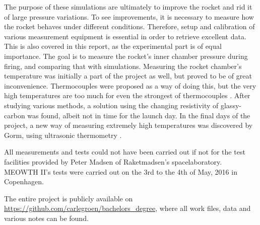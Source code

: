 The purpose of these simulations are ultimately to improve the rocket and rid it of large pressure variations. To see improvements, it is necessary to measure how the rocket behaves under different conditions. Therefore, setup and calibration of various measurement equipment is essential in order to retrieve excellent data. This is also covered in this report, as the experimental part is of equal importance. The goal is to measure the rocket's inner chamber pressure during firing, and comparing that with simulations. Measuring the rocket chamber's temperature was initially a part of the project as well, but proved to be of great inconvenience. Thermocouples were proposed as a way of doing this, but the very high temperatures are too much for even the strongest of thermocouples \cite{thermocoup}. After studying various methods, a solution using the changing resistivity of glassy-carbon was found, albeit not in time for the launch day. In the final days of the project, a new way of measuring extremely high temperatures was discovered by Gorm, using ultrasonic thermometry \cite{ultrasonic}.
 

All measurements and tests could not have been carried out if not for the test facilities provided by Peter Madsen of Raketmadsen's spacelaboratory. MEOWTH II's tests were carried out on the 3rd to the 4th of May, 2016 in Copenhagen.

The entire project is publicly available on \url{https://github.com/carlegroen/bachelors_degree}, where all work files, data and various notes can be found.


